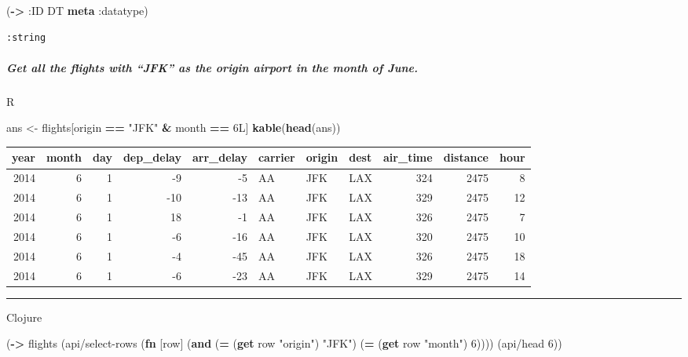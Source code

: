 \documentclass[]{article}
\newenvironment{Shaded}{\begin{snugshade}}{\end{snugshade}}
\newcommand{\AttributeTok}[1]{\textcolor[rgb]{0.77,0.63,0.00}{#1}}
\newcommand{\DecValTok}[1]{\textcolor[rgb]{0.00,0.00,0.81}{#1}}
\newcommand{\KeywordTok}[1]{\textcolor[rgb]{0.13,0.29,0.53}{\textbf{#1}}}
\newcommand{\NormalTok}[1]{#1}
\newcommand{\OperatorTok}[1]{\textcolor[rgb]{0.81,0.36,0.00}{\textbf{#1}}}
\newcommand{\StringTok}[1]{\textcolor[rgb]{0.31,0.60,0.02}{#1}}
\let\oldsubparagraph\subparagraph
\renewcommand{\subparagraph}[1]{\oldsubparagraph{#1}\mbox{}}
\begin{document}
\begin{Shaded}
\begin{Highlighting}[]
\NormalTok{(}\KeywordTok{->} \AttributeTok{:ID}\NormalTok{ DT }\KeywordTok{meta} \AttributeTok{:datatype}\NormalTok{)}
\end{Highlighting}
\end{Shaded}

\begin{verbatim}
:string
\end{verbatim}

\hypertarget{get-all-the-flights-with-jfk-as-the-origin-airport-in-the-month-of-june.}{%
\subparagraph{Get all the flights with ``JFK'' as the origin airport in
the month of
June.}\label{get-all-the-flights-with-jfk-as-the-origin-airport-in-the-month-of-june.}}

R

\begin{Shaded}
\begin{Highlighting}[]
\NormalTok{ans <-}\StringTok{ }\NormalTok{flights[origin }\OperatorTok{==}\StringTok{ "JFK"} \OperatorTok{&}\StringTok{ }\NormalTok{month }\OperatorTok{==}\StringTok{ }\NormalTok{6L]}
\KeywordTok{kable}\NormalTok{(}\KeywordTok{head}\NormalTok{(ans))}
\end{Highlighting}
\end{Shaded}

\begin{longtable}[]{@{}rrrrrlllrrr@{}}
\toprule
year & month & day & dep\_delay & arr\_delay & carrier & origin & dest &
air\_time & distance & hour\tabularnewline
\midrule
\endhead
2014 & 6 & 1 & -9 & -5 & AA & JFK & LAX & 324 & 2475 & 8\tabularnewline
2014 & 6 & 1 & -10 & -13 & AA & JFK & LAX & 329 & 2475 &
12\tabularnewline
2014 & 6 & 1 & 18 & -1 & AA & JFK & LAX & 326 & 2475 & 7\tabularnewline
2014 & 6 & 1 & -6 & -16 & AA & JFK & LAX & 320 & 2475 &
10\tabularnewline
2014 & 6 & 1 & -4 & -45 & AA & JFK & LAX & 326 & 2475 &
18\tabularnewline
2014 & 6 & 1 & -6 & -23 & AA & JFK & LAX & 329 & 2475 &
14\tabularnewline
\bottomrule
\end{longtable}

\begin{center}\rule{0.5\linewidth}{0.5pt}\end{center}

Clojure

\begin{Shaded}
\begin{Highlighting}[]
\NormalTok{(}\KeywordTok{->}\NormalTok{ flights}
\NormalTok{    (api/select-rows (}\KeywordTok{fn}\NormalTok{ [row] (}\KeywordTok{and}\NormalTok{ (}\KeywordTok{=}\NormalTok{ (}\KeywordTok{get}\NormalTok{ row }\StringTok{"origin"}\NormalTok{) }\StringTok{"JFK"}\NormalTok{)}
\NormalTok{                                   (}\KeywordTok{=}\NormalTok{ (}\KeywordTok{get}\NormalTok{ row }\StringTok{"month"}\NormalTok{) }\DecValTok{6}\NormalTok{))))}
\NormalTok{    (api/head }\DecValTok{6}\NormalTok{))}
\end{Highlighting}
\end{Shaded}
\end{document}
